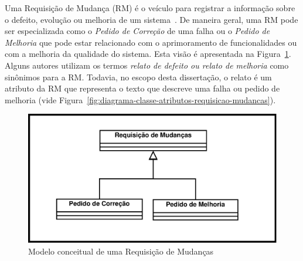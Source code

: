 


Uma Requisição de Mudança (RM) é o veículo para registrar a informação sobre o
defeito, evolução ou melhoria de um sistema~\cite{tripathy2014software}. De
maneira geral, uma RM pode ser especializada como o \textit{Pedido de Correção}
de uma falha ou o \textit{Pedido de Melhoria} que pode estar relacionado com o
aprimoramento de funcionalidades ou com a melhoria da qualidade do sistema. Esta
visão é apresentada na Figura~\ref{fig:diagrama-classe-requisicao-mudancas}.
Alguns autores utilizam os termos \textit{relato de defeito ou relato de
    melhoria} como sinônimos para a RM\@. Todavia, no escopo desta dissertação,
o relato é um atributo da RM que representa o texto que descreve uma falha ou
pedido de melhoria (vide
Figura~\ref{fig:diagrama-classe-atributos-requisicao-mudancas}).

\begin{figure}[htpb]
	\centering
	\includegraphics[width=0.5\linewidth]{./chapter-manutencao-software-visao-geral/img/diagrama-classe-conceitual-requisicao-mudancas.pdf}
	\caption{Modelo conceitual de uma Requisição de Mudanças}
\label{fig:diagrama-classe-requisicao-mudancas}
\end{figure}

